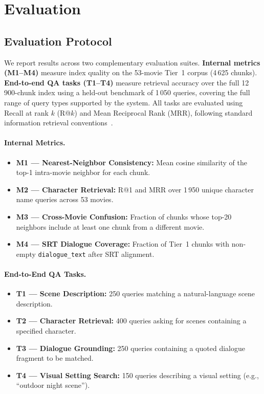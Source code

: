 \documentclass[11pt]{article}
\begin{document}
\section{Evaluation}
\label{sec:eval}

\subsection{Evaluation Protocol}

We report results across two complementary evaluation suites.
\textbf{Internal metrics (M1--M4)} measure index quality on the 53-movie
Tier~1 corpus (4\,625 chunks).  \textbf{End-to-end QA tasks (T1--T4)}
measure retrieval accuracy over the full 12\,900-chunk index using a
held-out benchmark of 1\,050 queries, covering the full range of query types
supported by the system.  All tasks are evaluated using Recall at rank $k$
(R@$k$) and Mean Reciprocal Rank (MRR), following standard information
retrieval conventions~\cite{ir_book}.

\paragraph{Internal Metrics.}
\begin{itemize}[leftmargin=1.4em]
  \item \textbf{M1 — Nearest-Neighbor Consistency:} Mean cosine similarity
        of the top-1 intra-movie neighbor for each chunk.
  \item \textbf{M2 — Character Retrieval:} R@1 and MRR over 1\,950 unique
        character name queries across 53 movies.
  \item \textbf{M3 — Cross-Movie Confusion:} Fraction of chunks whose top-20
        neighbors include at least one chunk from a different movie.
  \item \textbf{M4 — SRT Dialogue Coverage:} Fraction of Tier~1 chunks with
        non-empty \texttt{dialogue\_text} after SRT alignment.
\end{itemize}

\paragraph{End-to-End QA Tasks.}
\begin{itemize}[leftmargin=1.4em]
  \item \textbf{T1 — Scene Description:} 250 queries matching a
        natural-language scene description.
  \item \textbf{T2 — Character Retrieval:} 400 queries asking for scenes
        containing a specified character.
  \item \textbf{T3 — Dialogue Grounding:} 250 queries containing a quoted
        dialogue fragment to be matched.
  \item \textbf{T4 — Visual Setting Search:} 150 queries describing a visual
        setting (e.g., ``outdoor night scene'').
\end{itemize}
\end{document}
